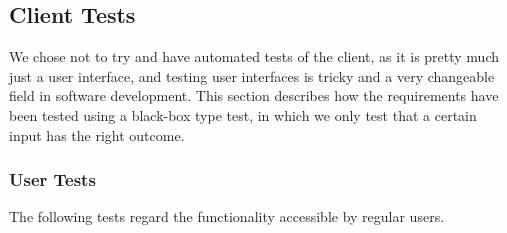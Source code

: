 \subsection{Client Tests}

We chose not to try and have automated tests of the client, as it is pretty
much just a user interface, and testing user interfaces is tricky and a very
changeable field in software development. This section describes how the
requirements have been tested using a black-box type test, in which we only
test that a certain input has the right outcome.

\subsubsection{User Tests}
The following tests regard the functionality accessible by regular users. \\

